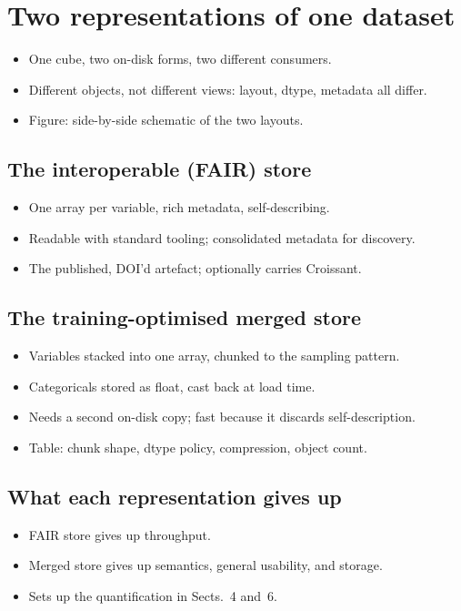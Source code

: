 \documentclass[gmd, manuscript]{copernicus}
\begin{document}
\section{Two representations of one dataset}
\begin{itemize}
\item One cube, two on-disk forms, two different consumers.
\item Different objects, not different views: layout, dtype, metadata all differ.
\item Figure: side-by-side schematic of the two layouts.
\end{itemize}

\subsection{The interoperable (FAIR) store}
\begin{itemize}
\item One array per variable, rich metadata, self-describing.
\item Readable with standard tooling; consolidated metadata for discovery.
\item The published, DOI'd artefact; optionally carries Croissant.
\end{itemize}
\subsection{The training-optimised merged store}
\begin{itemize}
\item Variables stacked into one array, chunked to the sampling pattern.
\item Categoricals stored as float, cast back at load time.
\item Needs a second on-disk copy; fast because it discards self-description.
\item Table: chunk shape, dtype policy, compression, object count.
\end{itemize}
\subsection{What each representation gives up}
\begin{itemize}
\item FAIR store gives up throughput.
\item Merged store gives up semantics, general usability, and storage.
\item Sets up the quantification in Sects.~4 and~6.
\end{itemize}
\end{document}
